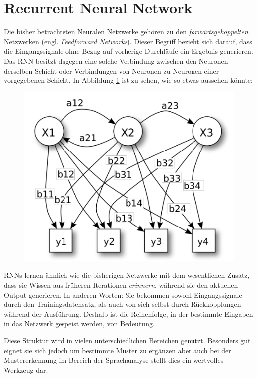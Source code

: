 \section{Recurrent Neural Network}

Die bisher betrachteten Neuralen Netzwerke gehören zu den \emph{forwärtsgekoppelten} Netzwerken (engl. \emph{Feedforward Networks}). Dieser Begriff bezieht sich darauf, dass die Eingangssignale ohne Bezug auf vorherige Durchläufe ein Ergebnis generieren. Das RNN besitzt dagegen eine solche Verbindung zwischen den Neuronen derselben Schicht oder Verbindungen von Neuronen zu Neuronen einer vorgegebenen Schicht. In Abbildung \ref{fig:rnnAufbau} ist zu sehen, wie so etwas aussehen könnte: 

\begin{figure}[!htb]
	\centering
	\includegraphics[width=.6\linewidth]{./img/rnn_aufbau}
	\label{fig:rnnAufbau}
\end{figure} 


RNNs lernen ähnlich wie die bisherigen Netzwerke mit dem wesentlichen Zusatz, dass sie Wissen aus früheren Iterationen \emph{erinnern}, während sie den aktuellen Output generieren. In anderen Worten: Sie bekommen sowohl Eingangssignale durch den Trainingsdatensatz, als auch von sich selbst durch Rückkopplungen während der Ausführung. Deshalb ist die Reihenfolge, in der bestimmte Eingaben in das Netzwerk gespeist werden, von Bedeutung. 

Diese Struktur wird in vielen unterschiedlichen Bereichen genutzt. Besonders gut eignet sie sich jedoch um bestimmte Muster zu ergänzen aber auch bei der Mustererkennung im Bereich der Sprachanalyse stellt dies ein wertvolles Werkzeug dar. 
